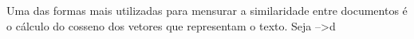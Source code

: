


Uma das formas mais utilizadas para mensurar a similaridade entre documentos é o cálculo do cosseno dos vetores que representam o texto. Seja -->d 




















